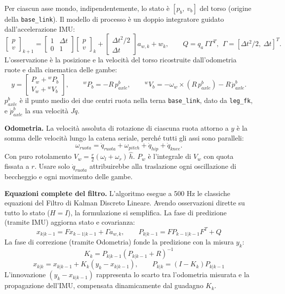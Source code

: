 \documentclass[
]{article}
\begin{document}
Per ciascun asse mondo, indipendentemente, lo stato è \([p_b,\ v_b]\) del torso (origine della \texttt{base\_link}). Il modello di processo è un doppio integratore guidato dall'accelerazione IMU: \[\begin{bmatrix}p\\v\end{bmatrix}_{k+1} = \begin{bmatrix}1&\Delta t\\0&1\end{bmatrix}\begin{bmatrix}p\\v\end{bmatrix}_k + \begin{bmatrix}\Delta t^2/2\\ \Delta t\end{bmatrix}a_{w,k} + w_k,\qquad Q = q_a\,\Gamma\Gamma^T,\ \ \Gamma = [\Delta t^2/2,\ \Delta t]^T .\] L'osservazione è la posizione e la velocità del torso ricostruite dall'odometria ruote e dalla cinematica delle gambe: \[y = \begin{bmatrix}P_w + {}^wP_b\\ V_w + {}^wV_b\end{bmatrix},\qquad {}^wP_b = -R\,p_{axle}^{b},\qquad {}^wV_b = -\omega_w\times(R\,p_{axle}^b) - R\,\dot p_{axle}^b .\] \(p_{axle}^b\) è il punto medio dei due centri ruota nella terna \texttt{base\_link}, dato da \texttt{leg\_fk}, e \(\dot p^b_{axle}\) la sua velocità \(J\dot q\).

\textbf{Odometria.} La velocità assoluta di rotazione di ciascuna ruota attorno a \(y\) è la somma delle velocità lungo la catena seriale, perché tutti gli assi sono paralleli: \[\omega_{ruota} = \dot q_{ruota} + \omega_{pitch} + \dot q_{hip} + \dot q_{knee} .\] Con puro rotolamento \(V_w = \tfrac r2(\omega_l+\omega_r)\,\hat h\). \(P_w\) è l'integrale di \(V_w\) con quota fissata a \(r\). Usare solo \(\dot q_{ruota}\) attribuirebbe alla traslazione ogni oscillazione di beccheggio e ogni movimento delle gambe.

\textbf{Equazioni complete del filtro.} L'algoritmo esegue a 500 Hz le classiche equazioni del Filtro di Kalman Discreto Lineare. Avendo osservazioni dirette su tutto lo stato (\(H=I\)), la formulazione si semplifica. La fase di predizione (tramite IMU) aggiorna stato e covarianza: \[x_{k|k-1} = F x_{k-1|k-1} + \Gamma a_{w,k}, \qquad P_{k|k-1} = F P_{k-1|k-1} F^T + Q\] La fase di correzione (tramite Odometria) fonde la predizione con la misura \(y_k\): \[K_k = P_{k|k-1}(P_{k|k-1} + R)^{-1}\] \[x_{k|k} = x_{k|k-1} + K_k (y_k - x_{k|k-1}), \qquad P_{k|k} = (I - K_k)P_{k|k-1}\] L'innovazione \((y_k - x_{k|k-1})\) rappresenta lo scarto tra l'odometria misurata e la propagazione dell'IMU, compensata dinamicamente dal guadagno \(K_k\).
\end{document}
